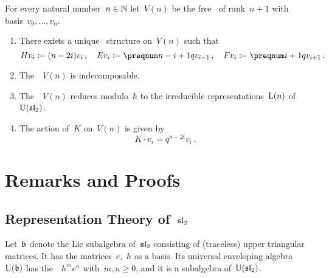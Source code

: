 \documentclass[a4paper, 11pt, oneside]{scrartcl}
\begin{document}
\begin{theorem}
  For every natural number~$n \in \mathbb{N}$ let~$V(n)$ be the free~\module{$\kfhbar$} of rank~$n+1$ with basis~$v_0, \dotsc, v_n$.
  \begin{enumerate}
    \item
      There exists a unique~ structure on~$V(n)$ such that
      \[
        H v_i \defined (n - 2i) v_i \,,
        \quad
        E v_i \defined \qnum{n - i + 1} v_{i-1} \,,
        \quad
        F v_i \defined \qnum{i+1} v_{i+1} \,.
      \]
    \item
      The~~$V(n)$ is indecomposable.
    \item
      The~~$V(n)$ reduces modulo~$\hbar$ to the irreducible representations~$\operatorname{L}(n)$ of~$\operatorname{U}(\mathfrak{sl}_2)$.
    \item
      The action of~$K$ on~$V(n)$ is given by
      \[
        K \cdot v_i = q^{n - 2i} v_i \,.
      \]
  \end{enumerate}
\end{theorem}













\appendix





\section{Remarks and Proofs}



\subsection{Representation Theory of~$\mathfrak{sl}_2$}
\label{appendix representation theory of sl2}


Let~$\mathfrak{b}$ denote the Lie subalgebra of~$\mathfrak{sl}_2$ consisting of (traceless) upper triangular matrices.
It has the matrices~$e$,~$h$ as a basis.
Its universal enveloping algebra~$\operatorname{U}(\mathfrak{b})$ has the~{\PBWbasis}~$h^m e^n$ with~$m, n \geq 0$, and it is a subalgebra of~$\operatorname{U}(\mathfrak{sl}_2)$.
\end{document}
